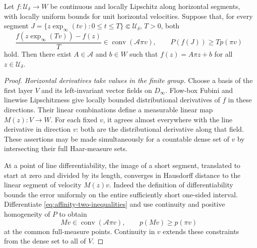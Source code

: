 \begin{lemma}\label{lem:affinity-criterion}
Let $f:\mathcal U_\delta\to W$ be continuous and locally Lipschitz
along horizontal segments, with locally uniform bounds for unit
horizontal velocities.  Suppose that, for every segment
$J=\{z\exp_\infty(tv):0\le t\le T\}\Subset\mathcal U_\delta$,
$T>0$, both
\begin{equation}\label{eq:affinity-two-inequalities}
 \frac{f(z\exp_\infty(Tv))-f(z)}{T}
       \in\operatorname{conv}(\mathcal A\pi v),
 \qquad P(f(J))\ge T p(\pi v)
\end{equation}
hold.  Then there exist $A\in\mathcal A$ and $b\in W$ such that
$f(z)=A\pi z+b$ for all $z\in\mathcal U_\delta$.
\end{lemma}

\begin{proof}
\emph{Horizontal derivatives take values in the finite group.}
Choose a basis of the first layer $V$ and its left-invariant vector
fields on $D_\infty$.  Flow-box Fubini and linewise Lipschitzness
give locally bounded distributional derivatives of $f$ in these
directions.  Their linear combinations define a measurable linear
map $M(z):V\to W$.  For each fixed $v$, it agrees almost everywhere
with the line derivative in direction $v$: both are the
distributional derivative along that field.  These assertions may
be made simultaneously for a countable dense set of $v$ by
intersecting their full Haar-measure sets.

At a point of line differentiability, the image of a short segment,
translated to start at zero and divided by its length, converges
in Hausdorff distance to the linear segment of velocity $M(z)v$.
Indeed the definition of differentiability bounds the error
uniformly on the entire sufficiently short one-sided interval.
Differentiate \eqref{eq:affinity-two-inequalities} and use continuity
and positive homogeneity of $P$ to obtain
\begin{equation}\label{eq:affinity-derivative-constraints}
 Mv\in\operatorname{conv}(\mathcal A\pi v),\qquad
 p(Mv)\ge p(\pi v)
\end{equation}
at the common full-measure points.  Continuity in $v$ extends these
constraints from the dense set to all of $V$.


\end{proof}

